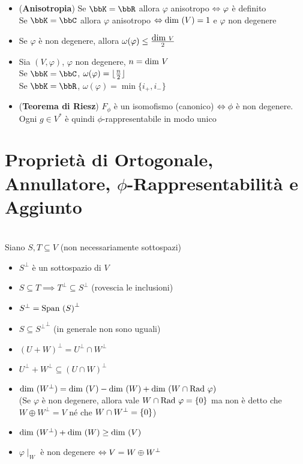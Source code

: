 \documentclass[a4paper,NoNotes,GeneralMath]{stdmdoc}
\begin{document}
\begin{itemize}
		\item ({\bf Anisotropia}) Se $\bbK = \bbR$ allora $\varphi$ anisotropo $\Leftrightarrow \varphi$ è definito \\ Se $\bbK = \bbC$ allora $\varphi$ anisotropo $\Leftrightarrow \mbox{dim }(V) = 1$ e $\varphi$ non degenere
	\end{itemize}
	\begin{itemize}
		\item Se $\varphi$ è non degenere, allora $\omega(\varphi) \le \frac{\mbox{dim } V}{2}$
		\item Sia $(V, \varphi)$, $\varphi$ non degenere, $n = \mbox{dim } V$ \\ Se $\bbK = \bbC$, $\omega(\varphi) = \lfloor \frac{n}{2} \rfloor$ \\ Se $\bbK = \bbR$, $\omega(\varphi) = \min\{i_{+}, i_{-}\}$
		\item ({\bf Teorema di Riesz}) $F_\phi$ è un isomofismo (canonico) $\Leftrightarrow \phi$ è non degenere. Ogni $g \in V^{*}$ è quindi $\phi$-rappresentabile in modo unico
	\end{itemize}

	\section*{Proprietà di Ortogonale, Annullatore, $\phi$-Rappresentabilità e Aggiunto}
	 \\ Siano $S, T \subseteq V$ (non necessariamente sottospazi)
	\begin{itemize}
		\item $S^\bot$ è un sottospazio di $V$
		\item $S \subseteq T \implies T^\bot \subseteq S^\bot$ (rovescia le inclusioni)
		\item $S^\bot = {\mbox{Span }(S)}^\bot$
		\item $S \subseteq {S^\bot}^\bot$ (in generale non sono uguali)
		\item $(U + W)^\bot = U^\bot \cap W^\bot$
		\item $U^\bot + W^\bot \subseteq (U \cap W)^\bot$
		\item $\mbox{dim }(W^\bot) = \mbox{dim }(V) - \mbox{dim }(W) + \mbox{dim }(W \cap \mbox{Rad }\varphi)$ \\ (Se $\varphi$ è non degenere, allora vale $W \cap \mbox{Rad } \varphi = \{0\}$ ma non è detto che $W \oplus W^\bot = V$ né che $W \cap W^\bot = \{0\}$)
		\item $\mbox{dim }(W^\bot) + \mbox{dim }(W) \ge \mbox{dim }(V)$
		\item $\varphi\mid_W$ è non degenere $\Leftrightarrow V = W \oplus W^\bot$
	\end{itemize}
\end{document}
